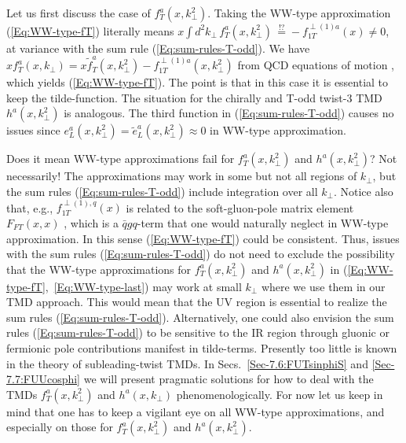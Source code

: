 \documentclass[a4paper,11pt]{article}
\def\kperp{k_\perp}
\begin{document}
Let us first discuss the case of $f_T^a(x,k_\perp^{2})$. Taking the
WW-type approximation (\ref{Eq:WW-type-fT}) literally means
$x\int d^2 k_\perp\,f_T^a(x,k_\perp^{2})\,\stackrel{!?}{=}
-f_{1T}^{\perp(1)a}(x)\neq0$,
at variance with the sum rule (\ref{Eq:sum-rules-T-odd}). We
have $xf_T^a(x,k_\perp)=x\tilde{f}_T^a(x,k_\perp^{2})-f_{1T}^{\perp(1)a}(x,k_\perp^{2})$
from QCD equations of motion \cite{Bacchetta:2006tn}, which yields
(\ref{Eq:WW-type-fT}). The point is that in this case it is
essential to keep the tilde-function.
The situation for the chirally and T-odd twist-3
TMD $h^a(x,k_\perp^{2})$ is analogous. The third
function in (\ref{Eq:sum-rules-T-odd}) causes no issues since
$e_L^a(x,k_\perp^{2})=\tilde{e}_L^a(x,k_\perp^{2})\approx0$ in WW-type approximation.

Does it mean WW-type approximations fail for $f_T^a(x,k_\perp^{2})$
and $h^a(x,k_\perp^{2})$? Not necessarily! The approximations may
work in some but not all regions of $\kperp$, but the sum rules
(\ref{Eq:sum-rules-T-odd}) include integration over all $k_\perp$.
Notice also that, e.g., $f_{1T}^{\perp (1),q}(x)$ is related to the
soft-gluon-pole matrix element $F_{FT}(x,x)$ \cite{Boer:2003cm,Ji:2006ub},
which is a $\bar{q}gq$-term that one would naturally neglect
in WW-type approximation.
In this sense (\ref{Eq:WW-type-fT}) could be consistent.
Thus, issues with the sum rules
(\ref{Eq:sum-rules-T-odd}) do not need to exclude the
possibility that the WW-type approximations for $f_T^a(x,k_\perp^{2})$ and
$h^a(x,k_\perp^{2})$ in (\ref{Eq:WW-type-fT},~\ref{Eq:WW-type-last})
may work at small $k_\perp$ where we use them in our TMD approach.
This would mean that the UV region is essential to realize the sum rules
(\ref{Eq:sum-rules-T-odd}). Alternatively, one could also envision
the sum rules (\ref{Eq:sum-rules-T-odd}) to be sensitive to the
IR region through gluonic or fermionic pole contributions manifest
in tilde-terms.
Presently too little is known in the theory of subleading-twist TMDs.
In Secs.~\ref{Sec-7.6:FUTsinphiS} and \ref{Sec-7.7:FUUcosphi} we
will present pragmatic solutions for how to deal with the TMDs
$f_T^a(x,k_\perp^{2})$ and $h^a(x,k_\perp)$ phenomenologically.
For now let us keep in mind that
one has to keep a vigilant eye on all WW-type approximations, and
especially on those for $f_T^a(x,k_\perp^{2})$ and $h^a(x,k_\perp^{2})$.
\end{document}

